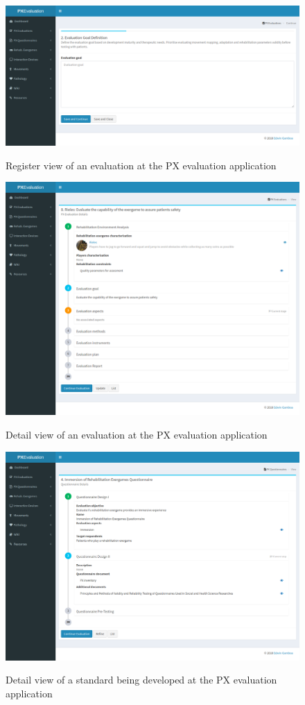 \begin{figure}[bth]
\myfloatalign
{\includegraphics[width=.8\linewidth]{gfx/app/evaluationApp1}} \quad
\caption{Register view of an evaluation at the \ac{PX} evaluation application}\label{fig:evaluationApp1}
\end{figure}

\begin{figure}[bth]
\myfloatalign
{\includegraphics[width=.8\linewidth]{gfx/app/evaluationApp2}} \quad
\caption{Detail view of an evaluation at the \ac{PX} evaluation application}\label{fig:evaluationApp2}
\end{figure}


\begin{figure}[bth]
\myfloatalign
{\includegraphics[width=.8\linewidth]{gfx/app/standardApp}} \quad
\caption{Detail view of a standard being developed at the \ac{PX} evaluation application}\label{fig:standardApp}
\end{figure}

